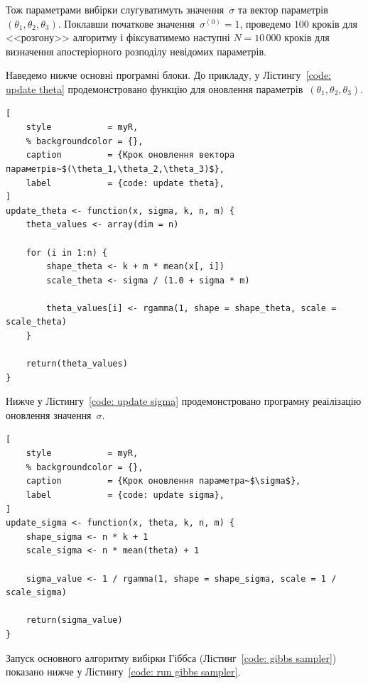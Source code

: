 Тож параметрами вибірки слугуватимуть значення~$\sigma$ та вектор параметрів~$\left( \theta_1,\theta_2,\theta_3 \right)$. Поклавши початкове значення~$\sigma^{(0)}=1$, проведемо $100$ кроків для <<розгону>> алгоритму і фіксуватимемо наступні $N=10\,000$ кроків для визначення апостеріорного розподілу невідомих параметрів. 

Наведемо нижче основні програмні блоки. До прикладу, у Лістингу~\ref{code: update theta} продемонстровано функцію для оновлення параметрів~$(\theta_1,\theta_2,\theta_3)$.

\vspace{0.4cm}
\begin{lstlisting}[
    style           = myR,
    % backgroundcolor = {},
    caption         = {Крок оновлення вектора параметрів~$(\theta_1,\theta_2,\theta_3)$},
    label           = {code: update theta},
]
update_theta <- function(x, sigma, k, n, m) {
    theta_values <- array(dim = n)

    for (i in 1:n) {
        shape_theta <- k + m * mean(x[, i])
        scale_theta <- sigma / (1.0 + sigma * m)

        theta_values[i] <- rgamma(1, shape = shape_theta, scale = scale_theta)
    }

    return(theta_values)
}
\end{lstlisting}

\vspace{0.4cm}
Нижче у Лістингу~\ref{code: update sigma} продемонстровано програмну реаілізацію оновлення значення~$\sigma$.

\vspace{0.4cm}
\begin{lstlisting}[
    style           = myR,
    % backgroundcolor = {},
    caption         = {Крок оновлення параметра~$\sigma$},
    label           = {code: update sigma},
]
update_sigma <- function(x, theta, k, n, m) {
    shape_sigma <- n * k + 1
    scale_sigma <- n * mean(theta) + 1

    sigma_value <- 1 / rgamma(1, shape = shape_sigma, scale = 1 / scale_sigma)

    return(sigma_value)
}
\end{lstlisting}

\vspace{0.4cm}
Запуск основного алгоритму вибірки Гіббса (Лістинг~\ref{code: gibbs sampler}) показано нижче у Лістингу~\ref{code: run gibbs sampler}.

